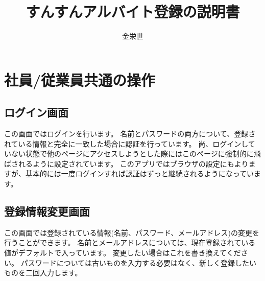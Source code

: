 \documentclass[11pt, a4paper]{jarticle}
\title{すんすんアルバイト登録の説明書}
\author{金栄世}
\begin{document}
\maketitle

\section{社員/従業員共通の操作}
	\subsection{ログイン画面}
		\begin{figure}[htbp]
			\centering
		\end{figure}
		この画面ではログインを行います。
		名前とパスワードの両方について、登録されている情報と完全に一致した場合に認証を行っています。
		尚、ログインしていない状態で他のページにアクセスしようとした際にはこのページに強制的に飛ばされるように設定されています。
		このアプリではブラウザの設定にもよりますが、基本的には一度ログインすれば認証はずっと継続されるようになっています。
		\clearpage

	\subsection{登録情報変更画面}
		\begin{figure}[htbp]
				\centering
		\end{figure}
		この画面では登録されている情報(名前、パスワード、メールアドレス)の変更を行うことができます。
		名前とメールアドレスについては、現在登録されている値がデフォルトで入っています。
		変更したい場合はこれを書き換えてください。
		パスワードについては古いものを入力する必要はなく、新しく登録したいものを二回入力します。
\end{document}
